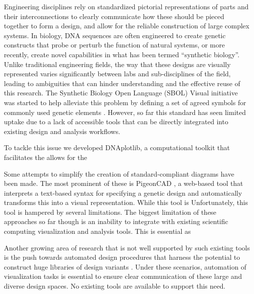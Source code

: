 \documentclass{bioinfo}
\begin{document}
Engineering disciplines rely on standardized pictorial representations of parts and their interconnections to clearly communicate how these should be pieced together to form a design, and allow for the reliable construction of large complex systems. In biology, DNA sequences are often engineered to create genetic constructs that probe or perturb the function of natural systems, or more recently, create novel capabilities in what has been termed ``synthetic biology''. Unlike traditional engineering fields, the way that these designs are visually represented varies significantly between labs and sub-disciplines of the field, leading to ambiguities that can hinder understanding and the effective reuse of this research. The Synthetic Biology Open Language (SBOL) Visual initiative was started to help alleviate this problem by defining a set of agreed symbols for commonly used genetic elements \citep{Quinn13a}. However, so far this standard has seen limited uptake due to a lack of accessible tools that can be directly integrated into existing design and analysis workflows.

To tackle this issue we developed DNAplotlib, a computational toolkit that facilitates the allows for the 

Some attempts to simplify the creation of standard-compliant diagrams have been made. The most prominent of these is PigeonCAD \citep{Bhatia13a}, a web-based tool that interprets a text-based syntax for specifying a genetic design and automatically transforms this into a visual representation. While this tool is Unfortunately, this tool is hampered by several limitations. The biggest limitation of these approaches so far though is an inability to integrate with existing scientific computing visualization and analysis tools. This is essential as 

Another growing area of research that is not well supported by such existing tools is the push towards automated design procedures that harness the potential to construct huge libraries of design variants \citep{Smanski14a,Bilitchenko11a}. Under these scenarios, automation of visualization tasks is essential to ensure clear communication of these large and diverse design spaces. No existing tools are available to support this need. 
\end{document}
